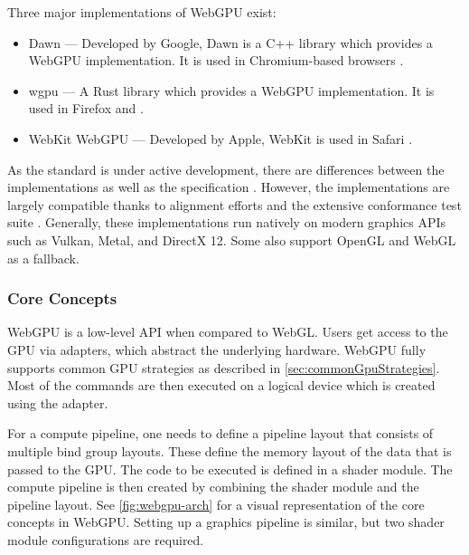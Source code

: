 Three major implementations of \gls{WebGPU} exist:

\begin{itemize}
  \item{\gls{Dawn}} — Developed by Google, \gls{Dawn} is a C++ library which provides a \gls{WebGPU} implementation. It is used in Chromium-based browsers \cite{dawnImplementation}.
  \item{\gls{wgpu}} — A Rust library which provides a \gls{WebGPU} implementation. It is used in Firefox and  \cite{wgpuImplementation}.
  \item{WebKit \gls{WebGPU}} — Developed by Apple, WebKit is used in Safari \cite{webKitWebGPUImplementation}.
\end{itemize}

As the standard is under active development, there are differences between the implementations as well as the specification \cite{wgpuStandardDeviation}. However, the implementations are largely compatible thanks to alignment efforts and the extensive conformance test suite \cite{WebGPUConformanceTestSuite}. Generally, these implementations run natively on modern graphics \glspl{API} such as \gls{Vulkan}, \gls{Metal}, and \gls{DirectX 12}. Some also support \gls{OpenGL} and \gls{WebGL} as a fallback.

\subsubsection{Core Concepts}

\gls{WebGPU} is a low-level \gls{API} when compared to \gls{WebGL}. Users get access to the \gls{GPU} via adapters, which abstract the underlying hardware. \gls{WebGPU} fully supports common \gls{GPU} strategies as described in \autoref{sec:commonGpuStrategies}. Most of the commands are then executed on a logical device which is created using the adapter.

For a compute pipeline, one needs to define a pipeline layout that consists of multiple bind group layouts. These define the memory layout of the data that is passed to the \gls{GPU}. The code to be executed is defined in a shader module. The compute pipeline is then created by combining the shader module and the pipeline layout. See \autoref{fig:webgpu-arch} for a visual representation of the core concepts in \gls{WebGPU}. Setting up a graphics pipeline is similar, but two shader module configurations are required.

